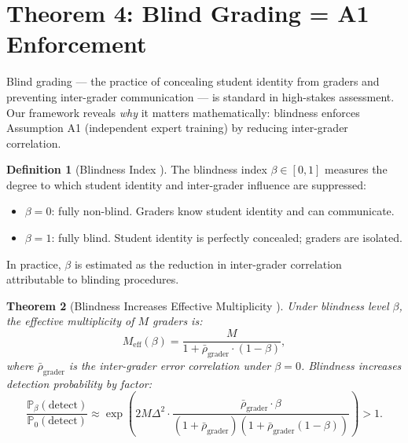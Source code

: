 \documentclass[11pt,a4paper]{article}
\newtheorem{theorem}{Theorem}[section]
\theoremstyle{definition}
\newtheorem{definition}[theorem]{Definition}
\theoremstyle{remark}
\newcommand{\Pbb}{\mathbb{P}}
\begin{document}
\section{Theorem 4: Blind Grading = A1 Enforcement}
\label{sec:theorem4}
Blind grading — the practice of concealing student identity from graders and preventing inter-grader communication — is standard in high-stakes assessment. Our framework reveals \textit{why} it matters mathematically: blindness enforces Assumption A1 (independent expert training) by reducing inter-grader correlation.
\begin{definition}[Blindness Index ]
\label{def:blindness}
The blindness index $\beta \in [0,1]$ measures the degree to which student identity and inter-grader influence are suppressed:
\begin{itemize}[nosep]
    \item $\beta = 0$: fully non-blind. Graders know student identity and can communicate.
    \item $\beta = 1$: fully blind. Student identity is perfectly concealed; graders are isolated.
\end{itemize}
In practice, $\beta$ is estimated as the reduction in inter-grader correlation attributable to blinding procedures.
\end{definition}
\begin{theorem}[Blindness Increases Effective Multiplicity ]
\label{thm:blind}
Under blindness level $\beta$, the effective multiplicity of $M$ graders is:
\begin{equation}
    M_{\text{eff}}(\beta) = \frac{M}{1 + \bar{\rho}_{\text{grader}} \cdot (1 - \beta)},
    \label{eq:Meff_beta}
\end{equation}
where $\bar{\rho}_{\text{grader}}$ is the inter-grader error correlation under $\beta = 0$. Blindness increases detection probability by factor:
\begin{equation}
    \frac{\Pbb_{\beta}(\text{detect})}{\Pbb_{0}(\text{detect})} \approx \exp\left(2 M \Delta^2 \cdot \frac{\bar{\rho}_{\text{grader}} \cdot \beta}{(1 + \bar{\rho}_{\text{grader}})(1 + \bar{\rho}_{\text{grader}}(1-\beta))}\right) > 1.
    \label{eq:blindness_gain}
\end{equation}
\end{theorem}
\end{document}

